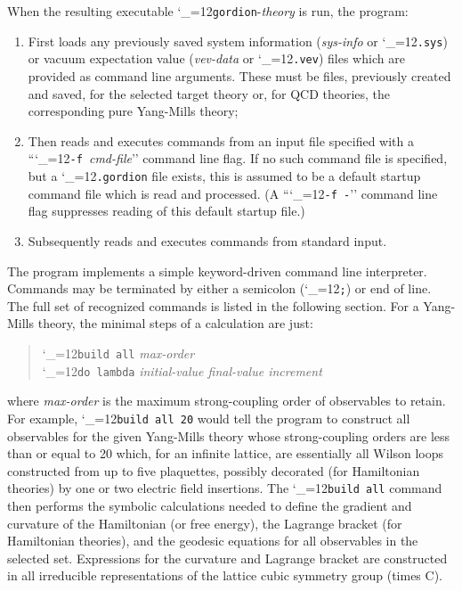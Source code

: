 \documentclass [12pt]{article}
\makeatletter
\renewcommand{\tt}{\begingroup\catcode`_=12\def\_{\string_}\tt@}
\newcommand{\tt@}[1]{\texttt{#1}\endgroup}
\makeatother
\begin{document}
%
When the resulting executable \tt{gordion}-\textit{theory} is run, the program:
\begin{enumerate}\advance\itemsep -6pt
\item
    First loads any previously saved system information
    (\textit{sys-info} or \tt{.sys}) or 
    vacuum expectation value (\textit{vev-data} or \tt{.vev}) files
    which are provided as command line arguments.
    These must be files, previously created and saved, for the selected target theory
    or, for QCD theories, the corresponding pure Yang-Mills theory;
\item
    Then reads and executes commands from an input file 
    specified with a ``\tt{-f }\textit{cmd-file}'' command line flag.
    If no such command file is specified, but a \tt{.gordion}
    file exists, this is assumed to be a default startup command file
    which is read and processed.
    (A ``\tt{-f -}'' command line flag suppresses reading of this
    default startup file.)
\item
    Subsequently reads and executes commands from standard input.
\end{enumerate}
%
The program implements a simple keyword-driven command line interpreter.
Commands may be terminated by either a semicolon (\tt{;}) or end of line.
The full set of recognized commands is listed in the following section.
%
For a Yang-Mills theory,
the minimal steps of a calculation are just:
\begin{quote}
  \tt{build all} \textit{max-order}
\\\tt{do lambda} \textit{initial-value final-value increment}
\end{quote}
%
where \textit{max-order} is the maximum strong-coupling order of observables
to retain.
For example, \tt{build all 20} would tell the program to construct all observables
for the given Yang-Mills theory whose strong-coupling orders are less than or equal to 20
which, for an infinite lattice, are essentially all
Wilson loops constructed from up to five plaquettes, possibly
decorated (for Hamiltonian theories) by one or two electric field insertions.
The \tt{build all} command then performs the symbolic calculations needed to define the
gradient and curvature of the Hamiltonian (or free energy),
the Lagrange bracket (for Hamiltonian theories),
and the geodesic equations for all observables in the selected set.
Expressions for the curvature and Lagrange bracket are constructed
in all irreducible representations of the lattice cubic symmetry group (times C).
\end{document}
